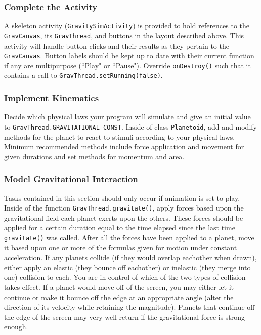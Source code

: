 \subsubsection{Complete the Activity}
A skeleton activity (\verb=GravitySimActivity=) is provided to hold references to the \verb=GravCanvas=, its \verb=GravThread=, and buttons in the layout described above.
This activity will handle button clicks and their results as they pertain to the \verb=GravCanvas=.
Button labels should be kept up to date with their current function if any are multipurpose (``Play" or ``Pause").
Override \verb=onDestroy()= such that it contains a call to \verb=GravThread.setRunning(false)=.

\subsubsection{Implement Kinematics}
Decide which physical laws your program will simulate and give an initial value to \verb=GravThread.GRAVITATIONAL_CONST=.
Inside of class \verb=Planetoid=, add and modify methods for the planet to react to stimuli according to your physical laws.
Minimum recommended methods include force application and movement for given durations and set methods for momentum and area.

\subsubsection{Model Gravitational Interaction}
Tasks contained in this section should only occur if animation is set to play.
Inside of the function \verb=GravThread.gravitate()=, apply forces based upon the gravitational field each planet exerts upon the others.
These forces should be applied for a certain duration equal to the time elapsed since the last time \verb=gravitate()= was called.
After all the forces have been applied to a planet, move it based upon one or more of the formulas given for motion under constant acceleration.
If any planets collide (if they would overlap eachother when drawn), either apply an elastic (they bounce off eachother) or inelastic (they merge into one) collision to each.
You are in control of which of the two types of collision takes effect.
If a planet would move off of the screen, you may either let it continue or make it bounce off the edge at an appropriate angle (alter the direction of its velocity while retaining the magnitude).
Planets that continue off the edge of the screen may very well return if the gravitational force is strong enough.

